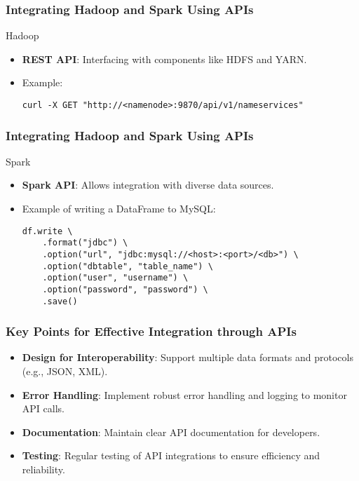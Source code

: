 \documentclass[aspectratio=169]{beamer}
\begin{document}
\begin{frame}[fragile]
    \frametitle{Integrating Hadoop and Spark Using APIs}
    \begin{block}{Hadoop}
        \begin{itemize}
            \item \textbf{REST API}: Interfacing with components like HDFS and YARN.
            \item Example:
            \begin{lstlisting}
curl -X GET "http://<namenode>:9870/api/v1/nameservices"
            \end{lstlisting}
        \end{itemize}
    \end{block}
\end{frame}

\begin{frame}[fragile]
    \frametitle{Integrating Hadoop and Spark Using APIs}
    \begin{block}{Spark}
        \begin{itemize}
            \item \textbf{Spark API}: Allows integration with diverse data sources.
            \item Example of writing a DataFrame to MySQL:
            \begin{lstlisting}
df.write \
    .format("jdbc") \
    .option("url", "jdbc:mysql://<host>:<port>/<db>") \
    .option("dbtable", "table_name") \
    .option("user", "username") \
    .option("password", "password") \
    .save()
            \end{lstlisting}
        \end{itemize}
    \end{block}
\end{frame}

\begin{frame}[fragile]
    \frametitle{Key Points for Effective Integration through APIs}
    \begin{itemize}
        \item \textbf{Design for Interoperability}: Support multiple data formats and protocols (e.g., JSON, XML).
        \item \textbf{Error Handling}: Implement robust error handling and logging to monitor API calls.
        \item \textbf{Documentation}: Maintain clear API documentation for developers.
        \item \textbf{Testing}: Regular testing of API integrations to ensure efficiency and reliability.
    \end{itemize}
\end{frame}
\end{document}
